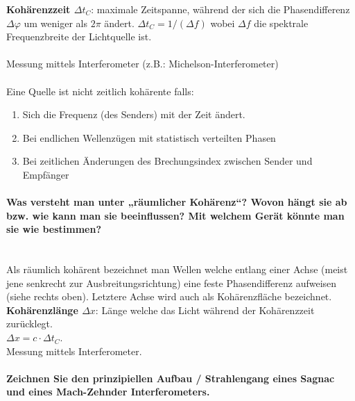 \documentclass[a4paper, 11pt, ngerman, parskip=half-]{scrartcl}
\newcommand{\myparagraph}[1]{\paragraph{#1}\mbox{}\\}
\begin{document}
\textbf{Kohärenzzeit $\Delta t_C$}: maximale Zeitspanne, während der sich die Phasendifferenz $\Delta \varphi$ um weniger als $2\pi$ ändert.
$\Delta t_C = 1/(\Delta f)$ wobei $\Delta f$ die spektrale Frequenzbreite der Lichtquelle ist. \\\\
Messung mittels Interferometer (z.B.: Michelson-Interferometer)\\\\
Eine Quelle ist nicht zeitlich kohärente falls:
\begin{enumerate}
    \item Sich die Frequenz (des Senders) mit der Zeit ändert.
    \item Bei endlichen Wellenzügen mit statistisch verteilten Phasen
    \item Bei zeitlichen Änderungen des Brechungsindex zwischen Sender und Empfänger
\end{enumerate}
\myparagraph{Was versteht man unter „räumlicher Kohärenz“? Wovon hängt sie ab bzw. wie kann man sie
    beeinflussen? Mit welchem Gerät könnte man sie wie bestimmen?}

Als \glqq räumlich kohärent \grqq bezeichnet man Wellen welche entlang einer Achse (meist jene senkrecht zur Ausbreitungsrichtung) eine feste Phasendifferenz aufweisen (siehe rechts oben).
Letztere Achse wird auch als Kohärenzfläche bezeichnet. \\
\textbf{Kohärenzlänge $\Delta x$}: Länge welche das Licht während der Kohärenzzeit zurücklegt. \\$\Delta x = c \cdot \Delta t_C$.\\
    Messung mittels Interferometer.

    \myparagraph{Zeichnen Sie den prinzipiellen Aufbau / Strahlengang eines Sagnac und eines Mach-Zehnder Interferometers.}
\end{document}
